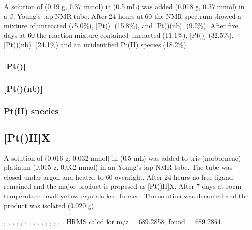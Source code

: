 A solution of \tBusixantphos{} (0.19 g, 0.37 mmol) in  (0.5 mL) was added \ce{[Pt(nb)3]} (0.018 g, 0.37 mmol) in a J. Young's tap NMR tube.  After 24 hours at 60\degC{} the \phosphorus{} NMR spectrum showed a mixture of unreacted \tBusixantphos{} (75.0\%), [Pt(\tBusixantphos)] (15.8\%), and [Pt(\tBusixantphos)(nb)] (9.2\%).  After five days at 60\degC{} the reaction mixture contained unreacted \tBusixantphos{} (11.1\%), [Pt(\tBusixantphos)] (32.5\%), [Pt(\tBusixantphos)(nb)] (24.1\%) and an unidentified Pt(II) species (18.2\%).  

\subsubsection*{[Pt(\tBusixantphos)]}


\subsubsection*{[Pt(\tBusixantphos)(nb)]}


\subsubsection*{Pt(II) \tBusixantphos{} species}


\subsection*{[Pt(\tBuxantphos)H]X}


A solution of \tBuxantphos{} (0.016 g, 0.032 mmol) in  (0.5 mL) was added to tris-(norbornene)-platinum (0.015 g, 0.032 mmol) in an Young's tap NMR tube.  The tube was closed under argon and heated to 60 \degC{} overnight.  After 24 hours no free ligand remained and the major product is proposed as [Pt(\tBuxantphosk)H]X.  After 7 days at room temperature small yellow crystals had formed.  The solution was decanted and the product was isolated (0.020 g).  

,
,
,
,
,
.
,
,
,
,
,
,
,
,
.
HRMS calcd for  m/z = 689.2858; found = 689.2864.

